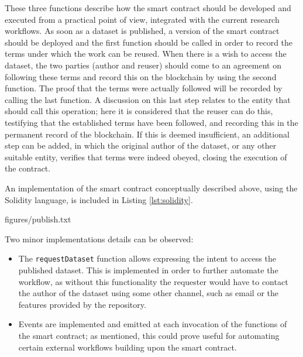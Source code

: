 These three functions describe how the smart contract should be developed and executed from a practical point of view, integrated with the current research workflows. As soon as a dataset is published, a version of the smart contract should be deployed and the first function should be called in order to record the terms under which the work can be reused. When there is a wish to access the dataset, the two parties (author and reuser) should come to an agreement on following these terms and record this on the blockchain by using the second function. The proof that the terms were actually followed will be recorded by calling the last function. A discussion on this last step relates to the entity that should call this operation; here it is considered that the reuser can do this, testifying that the established terms have been followed, and recording this in the permanent record of the blockchain. If this is deemed insufficient, an additional step can be added, in which the original author of the dataset, or any other suitable entity, verifies that terms were indeed obeyed, closing the execution of the contract.

An implementation of the smart contract conceptually described above, using the Solidity language, is included in Listing \ref{lst:solidity}.


  {figures/publish.txt}

Two minor implementations details can be observed:
\begin{itemize}
\item The \texttt{requestDataset} function allows expressing the intent to access the published dataset. This
is implemented in order to further automate the workflow, as without this functionality the requester would have to contact the author of the dataset using some other channel, such as email or
the features provided by the repository.
\item Events are implemented and emitted at each invocation of the functions of the smart contract; as mentioned, this could
prove useful for automating certain external workflows building upon the smart contract.
\end{itemize}

